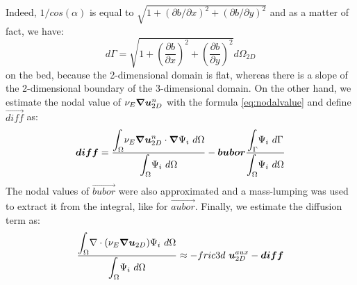 Indeed, $1/cos(\alpha)$ is equal to $\sqrt{1+\left(\partial b/\partial x\right)^{2}+\left(\partial b/\partial y\right)^{2}}$
and as a matter of fact, we have:
\begin{equation}
d\Gamma=\sqrt{1+\left(\dfrac{\partial b}{\partial x}\right)^{2}
+\left(\dfrac{\partial b}{\partial y}\right)^{2}}d\Omega_{2D}
\end{equation}
on the bed, because the 2-dimensional domain is flat, whereas there is a
slope of the 2-dimensional boundary of the 3-dimensional domain.
On the other hand, we estimate the nodal value of $\nu_{E}\bm{\nabla}\bm{u}_{2D}^{n}$
with the formula \eqref{eq:nodalvalue} and define $\vec{diff}$ as:
\begin{equation}
\bm{diff}=\dfrac{\displaystyle{\int_{\Omega}}\nu_{E}\bm{\nabla}\bm{u}_{2D}^{n}
\cdot\bm{\nabla}\Psi_{i}~d\Omega}{\displaystyle{\int_{\Omega}}\Psi_{i}~d\Omega}
-\bm{bubor}\dfrac{\displaystyle{\int_{\Gamma}}\Psi_{i}~d\Gamma}
{\displaystyle{\int_{\Omega}}\Psi_{i}~d\Omega}
\end{equation}
The nodal values of $\vec{bubor}$ were also approximated and a mass-lumping
was used to extract it from the integral, like for $\vec{aubor}$.
Finally, we estimate the diffusion term as:
\begin{equation}
\dfrac{\displaystyle{\int_{\Omega}}\nabla \cdot(\nu_{E}\bm{\nabla}\bm{u}_{2D})\Psi_{i}~d\Omega}
{\displaystyle{\int_{\Omega}}\Psi_{i}~d\Omega}\approx
-fric3d~\bm{u}_{2D}^{aux}-\bm{diff}
\end{equation}

